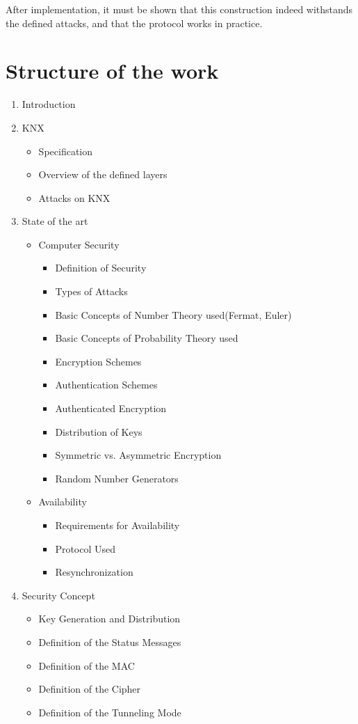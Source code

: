 \documentclass[a4paper,12pt,twoside]{memoir}
\begin{document}
After implementation, it must be shown that this construction indeed withstands the defined attacks,
and that the protocol works in practice.
 

\section{Structure of the work}
\begin{enumerate}
  \item Introduction
  \item KNX
  \begin{itemize}
    \item Specification
    \item Overview of the defined layers
    \item Attacks on KNX
  \end{itemize}
 
  \item State of the art
      \begin{itemize}
  
  \item Computer Security
  \begin{itemize}
    \item Definition of Security
    \item Types of Attacks
    \item Basic Concepts of Number Theory used(Fermat, Euler)
    \item Basic Concepts of Probability Theory used
    \item Encryption Schemes
    \item Authentication Schemes
    \item Authenticated Encryption
    \item Distribution of Keys
    \item Symmetric vs. Asymmetric Encryption
    \item Random Number Generators
  \end{itemize}

  \item Availability
  \begin{itemize}
    \item Requirements for Availability
    \item Protocol Used
    \item Resynchronization
  \end{itemize}
    \end{itemize}

  \item Security Concept
  \begin{itemize}
    \item Key Generation and Distribution
    \item Definition of the Status Messages
    \item Definition of the MAC
    \item Definition of the Cipher
    \item Definition of the Tunneling Mode
    

\end{itemize}
\end{enumerate}
\end{document}
